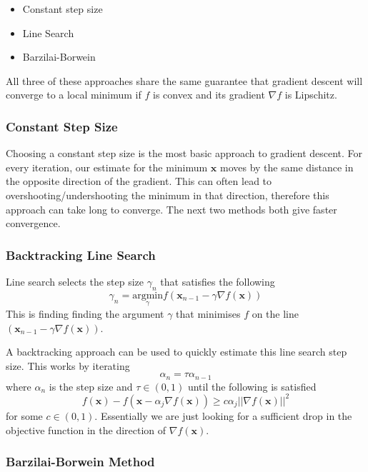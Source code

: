 \documentclass[12pt,]{article}
\providecommand{\tightlist}{%
  \setlength{\itemsep}{0pt}\setlength{\parskip}{0pt}}
\begin{document}
\begin{itemize}
\tightlist
\item
  Constant step size
\item
  Line Search
\item
  Barzilai-Borwein
\end{itemize}

All three of these approaches share the same guarantee that gradient
descent will converge to a local minimum if \(f\) is convex and its
gradient \(\nabla f\) is Lipschitz.

\hypertarget{constant-step-size}{%
\subsubsection{Constant Step Size}\label{constant-step-size}}

Choosing a constant step size is the most basic approach to gradient
descent. For every iteration, our estimate for the minimum
\(\mathbf{x}\) moves by the same distance in the opposite direction of
the gradient. This can often lead to overshooting/undershooting the
minimum in that direction, therefore this approach can take long to
converge. The next two methods both give faster convergence.

\hypertarget{backtracking-line-search}{%
\subsubsection{Backtracking Line
Search}\label{backtracking-line-search}}

Line search selects the step size \(\gamma_n\) that satisfies the
following
\[ \gamma_n = \underset{\gamma}{\text{argmin}} f(\mathbf{x}_{n-1} - \gamma\nabla f(\mathbf{x}))\]
This is finding finding the argument \(\gamma\) that minimises \(f\) on
the line \((\mathbf{x}_{n-1} - \gamma\nabla f(\mathbf{x}))\).

A backtracking approach can be used to quickly estimate this line search
step size. This works by iterating \[ \alpha_n = \tau \alpha_{n - 1}\]
where \(\alpha_n\) is the step size and \(\tau \in (0, 1)\) until the
following is satisfied
\[{f(\mathbf{x}) - f(\mathbf{x} - \alpha_j \nabla f(\mathbf{x}))} \ge c \alpha_j ||\nabla f(\mathbf{x})||^2\]
for some \(c \in (0, 1)\). Essentially we are just looking for a
sufficient drop in the objective function in the direction of
\(\nabla f(\mathbf{x})\).

\hypertarget{barzilai-borwein-method}{%
\subsubsection{Barzilai-Borwein Method}\label{barzilai-borwein-method}}
\end{document}
